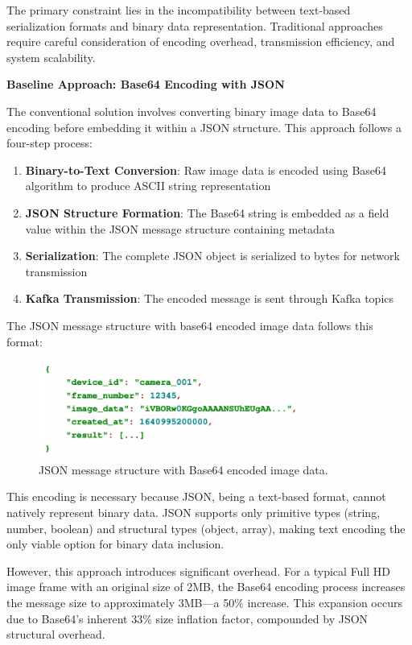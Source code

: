 The primary constraint lies in the incompatibility between text-based serialization formats and binary data representation. Traditional approaches require careful consideration of encoding overhead, transmission efficiency, and system scalability.

\textbf{Baseline Approach: Base64 Encoding with JSON}

The conventional solution involves converting binary image data to Base64 encoding before embedding it within a JSON structure. This approach follows a four-step process:

\begin{enumerate}
    \item \textbf{Binary-to-Text Conversion}: Raw image data is encoded using Base64 algorithm to produce ASCII string representation
    \item \textbf{JSON Structure Formation}: The Base64 string is embedded as a field value within the JSON message structure containing metadata
    \item \textbf{Serialization}: The complete JSON object is serialized to bytes for network transmission
    \item \textbf{Kafka Transmission}: The encoded message is sent through Kafka topics
\end{enumerate}

The JSON message structure with base64 encoded image data follows this format:

\begin{figure}[htbp]
    \centering
    \includegraphics[width=1\textwidth]{Figure/json_base64.png}
    \caption{JSON message structure with Base64 encoded image data.}
    \label{fig:json_base64}
\end{figure}

This encoding is necessary because JSON, being a text-based format, cannot natively represent binary data. JSON supports only primitive types (string, number, boolean) and structural types (object, array), making text encoding the only viable option for binary data inclusion.

However, this approach introduces significant overhead. For a typical Full HD image frame with an original size of 2MB, the Base64 encoding process increases the message size to approximately 3MB—a 50\% increase. This expansion occurs due to Base64's inherent 33\% size inflation factor, compounded by JSON structural overhead.


